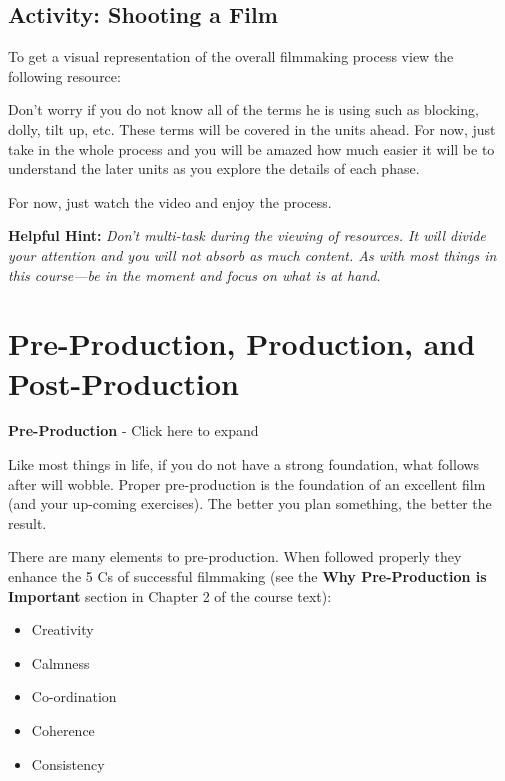 \documentclass[
]{book}
\providecommand{\tightlist}{%
  \setlength{\itemsep}{0pt}\setlength{\parskip}{0pt}}
\begin{document}
\hypertarget{activity-shooting-a-film}{%
\subsection*{Activity: Shooting a Film}\label{activity-shooting-a-film}}

\begin{reflect}
To get a visual representation of the overall filmmaking process view the following resource:

Don't worry if you do not know all of the terms he is using such as blocking, dolly, tilt up, etc. These terms will be covered in the units ahead. For now, just take in the whole process and you will be amazed how much easier it will be to understand the later units as you explore the details of each phase.

For now, just watch the video and enjoy the process.

\textbf{Helpful Hint:} \emph{Don't multi-task during the viewing of resources. It will divide your attention and you will not absorb as much content. As with most things in this course---be in the moment and focus on what is at hand.}
\end{reflect}

\hypertarget{pre-production-production-and-post-production}{%
\section{Pre-Production, Production, and Post-Production}\label{pre-production-production-and-post-production}}

\textbf{Pre-Production} - Click here to expand

Like most things in life, if you do not have a strong foundation, what follows after will wobble. Proper pre-production is the foundation of an excellent film (and your up-coming exercises). The better you plan something, the better the result.

There are many elements to pre-production. When followed properly they enhance the 5 Cs of successful filmmaking (see the \textbf{Why Pre-Production is Important} section in Chapter 2 of the course text):

\begin{itemize}
\tightlist
\item
  Creativity\\
\item
  Calmness\\
\item
  Co-ordination\\
\item
  Coherence\\
\item
  Consistency
\end{itemize}
\end{document}
